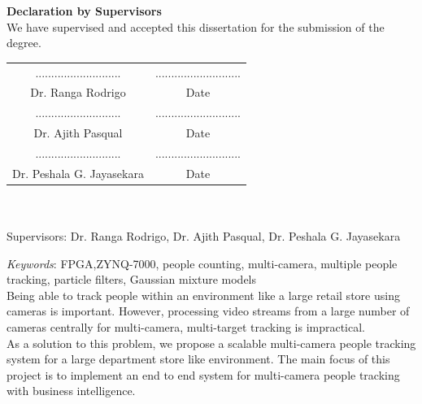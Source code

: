 \documentclass[12pt,a4paper]{report}
\begin{document}
\newpage
\noindent \textbf{Declaration by Supervisors}\\[0.5cm]
We have supervised and accepted this dissertation for the submission of the degree.\\[1cm]
\begin{table}[h]
\begin{tabular}{cc}
........................... & \hspace{5cm}........................... \\
Dr. Ranga Rodrigo           & \hspace{5cm}Date                        \\[1cm]
........................... & \hspace{5cm}........................... \\
Dr. Ajith Pasqual           & \hspace{5cm}Date                        \\[1cm]
........................... & \hspace{5cm}........................... \\
Dr. Peshala G. Jayasekara   & \hspace{5cm}Date                       
\end{tabular}
\end{table}
\newpage
{}
\begin{center}
\fontsize{18pt}{18}\\[0.5cm]
\fontsize{12pt}{12}\selectfont{Group Members: R.V.C.N. Abeyrathne, D.L. Dampahalage, H.A.S.P. Gunasekara, W.M.D.K. Weerakoon}\\[0.25cm]
Supervisors: Dr. Ranga Rodrigo, Dr. Ajith Pasqual, Dr. Peshala G. Jayasekara
\end{center}
\textit{Keywords}: FPGA,ZYNQ-7000, people counting, multi-camera, multiple people tracking, particle filters, Gaussian mixture models\\[0.5cm]
Being able to track people within an environment like a large retail store using cameras is important. However, processing video streams from a large number of cameras centrally for multi-camera, multi-target tracking is impractical. \\
As a solution to this problem, we propose a scalable multi-camera people tracking system for a large department store like environment. The main focus of this project is to implement an end to end system for multi-camera people tracking with business intelligence.
\end{document}
